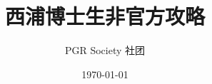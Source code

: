 \documentclass[lang=cn,12pt,newtx]{elegantbook}
\title{西浦博士生非官方攻略}
\author{PGR Society 社团}
\date{\today}
\begin{document}
\maketitle
\frontmatter


\tableofcontents
\mainmatter










\backmatter	




\makeatletter
\makeatother
\end{document}
